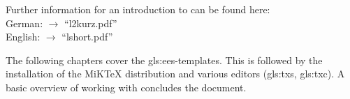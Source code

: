 \vfill
Further information for an introduction to \Latex can be found here: \\
German: \cite{CTANTeam.2020c} $\rightarrow$ \enquote{l2kurz.pdf} \\
English: \cite{CTANTeam.2020b} $\rightarrow$ \enquote{lshort.pdf}

\vfill
The following chapters cover the \gls{gls:ees}-\Latex templates. This is followed by the installation of the MiKTeX distribution and various editors (\gls{gls:txs}, \gls{gls:txc}). A basic overview of working with \Latex concludes the document.